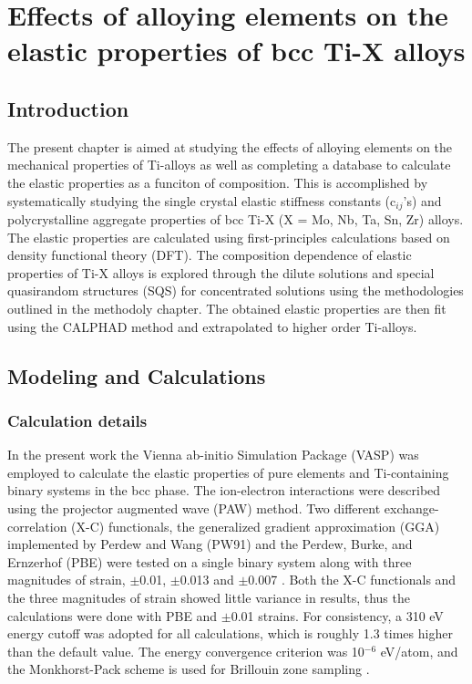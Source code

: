 \chapter{Effects of alloying elements on the elastic properties of bcc Ti-X alloys}

\section{Introduction}

The present chapter is aimed at studying the effects of alloying elements on the mechanical properties of Ti-alloys as well as completing a database to calculate the elastic properties as a funciton of composition. This is accomplished by systematically studying the single crystal elastic stiffness constants (c$_{ij}$'s) and polycrystalline aggregate properties of bcc Ti-X (X = Mo, Nb, Ta, Sn, Zr) alloys. The elastic properties are calculated using first-principles calculations based on density functional theory (DFT). The composition dependence of elastic properties of Ti-X alloys is explored through the dilute solutions and special quasirandom structures (SQS) \cite{Jiang2004} for concentrated solutions using the methodologies outlined in the methodoly chapter. The obtained elastic properties are then fit using the CALPHAD method and extrapolated to higher order Ti-alloys. 

\section{Modeling and Calculations}

\subsection{Calculation details}
In the present work the Vienna ab-initio Simulation Package (VASP) \cite{Kresse1996} was employed to calculate the elastic properties of pure elements and Ti-containing binary systems in the bcc phase. The ion-electron interactions were described using the projector augmented wave (PAW) \cite{Kresse1999,Blochl1994} method. Two different exchange-correlation (X-C) functionals, the generalized gradient approximation (GGA) implemented by Perdew and Wang (PW91) and the Perdew, Burke, and Ernzerhof (PBE) were tested on a single binary system along with three magnitudes of strain, $\pm$0.01, $\pm$0.013 and $\pm$0.007 \cite{Perdew1996a}. Both the X-C functionals and the three magnitudes of strain showed little variance in results, thus the calculations were done with PBE and $\pm$0.01 strains. For consistency, a 310 eV energy cutoff was adopted for all calculations, which is roughly 1.3 times higher than the default value. The energy convergence criterion was 10$^{-6}$ eV/atom, and the Monkhorst-Pack scheme is used for Brillouin zone sampling \cite{Kresse1996,Monkhorst1976a}. 

